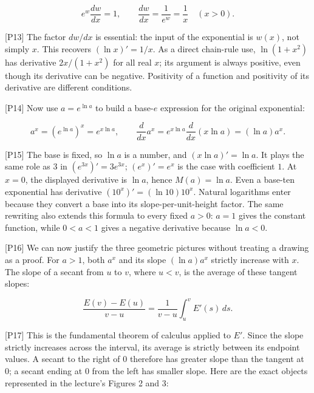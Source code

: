 \documentclass[
  11pt,
]{article}
\providecommand{\gt}{>}
\providecommand{\lt}{<}
\begin{document}
\[
e^w\frac{dw}{dx}=1,
\qquad \frac{dw}{dx}=\frac1{e^w}=\frac1x\quad(x\gt0).
\]

{[}P13{]} The factor \(dw/dx\) is essential: the input of the
exponential is \(w(x)\), not simply \(x\). This recovers
\((\ln x)'=1/x\). As a direct chain-rule use, \(\ln(1+x^2)\) has
derivative \(2x/(1+x^2)\) for all real \(x\); its argument is always
positive, even though its derivative can be negative. Positivity of a
function and positivity of its derivative are different conditions.

{[}P14{]} Now use \(a=e^{\ln a}\) to build a base-\(e\) expression for
the original exponential:

\[
a^x=(e^{\ln a})^x=e^{x\ln a},
\qquad \frac{d}{dx}a^x=e^{x\ln a}\frac{d}{dx}(x\ln a)
=(\ln a)a^x.
\]

{[}P15{]} The base is fixed, so \(\ln a\) is a number, and
\((x\ln a)'=\ln a\). It plays the same role as \(3\) in
\((e^{3x})'=3e^{3x}\); \((e^x)'=e^x\) is the case with coefficient
\(1\). At \(x=0\), the displayed derivative is \(\ln a\), hence
\(M(a)=\ln a\). Even a base-ten exponential has derivative
\((10^x)'=(\ln10)10^x\). Natural logarithms enter because they convert a
base into its slope-per-unit-height factor. The same rewriting also
extends this formula to every fixed \(a\gt0\): \(a=1\) gives the
constant function, while \(0\lt a\lt1\) gives a negative derivative
because \(\ln a\lt0\).

{[}P16{]} We can now justify the three geometric pictures without
treating a drawing as a proof. For \(a\gt1\), both \(a^x\) and its slope
\((\ln a)a^x\) strictly increase with \(x\). The slope of a secant from
\(u\) to \(v\), where \(u\lt v\), is the average of these tangent
slopes:

\[
\frac{E(v)-E(u)}{v-u}
=\frac1{v-u}\int_u^v E'(s)\,ds.
\]

{[}P17{]} This is the fundamental theorem of calculus applied to \(E'\).
Since the slope strictly increases across the interval, its average is
strictly between its endpoint values. A secant to the right of \(0\)
therefore has greater slope than the tangent at \(0\); a secant ending
at \(0\) from the left has smaller slope. Here are the exact objects
represented in the lecture's Figures 2 and 3:
\end{document}
